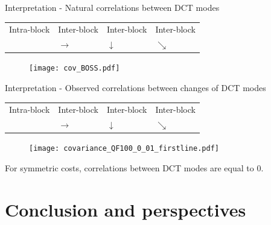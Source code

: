 \documentclass[10pt,aspectratio=169]{beamer}
\begin{document}
\begin{frame}{Interpretation - Natural correlations between DCT modes~}
    \begin{tabularx}{0.9\textwidth} { 
        >{\centering\arraybackslash}X 
        >{\centering\arraybackslash}X 
        >{\centering\arraybackslash}X
        >{\centering\arraybackslash}X  }
        Intra-block & Inter-block & Inter-block & Inter-block \\ 
        &  $\rightarrow$ & $\downarrow$& $\searrow$ 
   \end{tabularx}

    \begin{figure}[h]
        \texttt{[image: cov\_BOSS.pdf]}
    \end{figure}
\end{frame}


\begin{frame}{Interpretation - Observed correlations between changes of DCT modes}
        

    \begin{tabularx}{0.9\textwidth} { 
         >{\centering\arraybackslash}X 
         >{\centering\arraybackslash}X 
         >{\centering\arraybackslash}X
         >{\centering\arraybackslash}X  }
         Intra-block & Inter-block & Inter-block & Inter-block \\ 
         &  $\rightarrow$ & $\downarrow$& $\searrow$ 
    \end{tabularx}

    \begin{figure}[h]
        \texttt{[image: covariance\_QF100\_0\_01\_firstline.pdf]}
    \end{figure}

    \pause
    For symmetric costs, correlations between DCT modes are equal to 0. 
    
\end{frame}




\section{Conclusion and perspectives}
\end{document}
